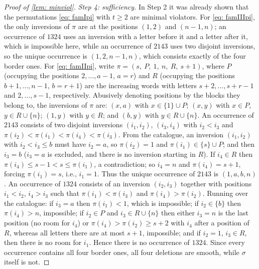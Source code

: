 \documentclass[10pt,a4paper]{amsart}
\begin{document}
\begin{proof}[Proof of \cref{lem: minviol}]
\emph{Step 4: sufficiency.}
In Step 2 it was already shown that the permutations \cref{eq: famIpi} with $t\ge2$ are minimal violators.
For \cref{eq: famIIIpi}, the only inversions of $\pi$ are at the positions $(1,2)$ and $(n-1,n)$; an occurrence of
$1324$ uses an inversion with a letter before it and a letter after it, which is impossible here, while an occurrence
of $2143$ uses two disjoint inversions, so the unique occurrence is $(1,2,n-1,n)$, which consists exactly of the four
border ones. For \cref{eq: famIIpi}, write $\pi=(s,\ P,\ 1,\ n,\ R,\ s+1)$, where $P$ (occupying the positions $2,\dots,a-1$,
$a=r$) and $R$ (occupying the positions $b+1,\dots,n-1$, $b=r+1$) are the increasing words with letters
$s+2,\dots,s+r-1$ and $2,\dots,s-1$, respectively. Abusively denoting positions by the blocks they belong to,
the inversions of $\pi$ are: $(x,a)$ with $x\in\{1\}\cup P$; $(x,y)$ with $x\in P$, $y\in R\cup\{n\}$;
$(1,y)$ with $y\in R$; and $(b,y)$ with $y\in R\cup\{n\}$.
An occurrence of $2143$ consists of two disjoint inversions $(i_1,i_2)$, $(i_3,i_4)$ with $i_2<i_3$ and
$\pi(i_2)<\pi(i_1)<\pi(i_4)<\pi(i_3)$. From the catalogue, an inversion $(i_1,i_2)$ with $i_2<i_3\le b$ must have
$i_2=a$, so $\pi(i_2)=1$ and $\pi(i_1)\in\{s\}\cup P$; and then $i_3=b$ ($i_3=a$ is excluded, and there is no
inversion starting in $R$). If $i_4\in R$ then $\pi(i_4)\le s-1<s\le\pi(i_1)$, a contradiction; so $i_4=n$ and
$\pi(i_4)=s+1$, forcing $\pi(i_1)=s$, i.e., $i_1=1$. Thus the unique occurrence of $2143$ is $(1,a,b,n)$.
An occurrence of $1324$ consists of an inversion $(i_2,i_3)$ together with positions $i_1<i_2$, $i_4>i_3$ such that
$\pi(i_1)<\pi(i_3)$ and $\pi(i_4)>\pi(i_2)$. Running over the catalogue: if $i_3=a$ then $\pi(i_1)<1$, which is
impossible; if $i_2\in\{b\}$ then $\pi(i_4)>n$, impossible; if $i_2\in P$ and $i_3\in R\cup\{n\}$ then either
$i_3=n$ is the last position (no room for $i_4$) or $\pi(i_4)>\pi(i_2)\ge s+2$ with $i_4$ after a position of $R$,
whereas all letters there are at most $s+1$, impossible; and if $i_2=1$, $i_3\in R$, then there is no room for
$i_1$. Hence there is no occurrence of $1324$. Since every occurrence contains all four border
ones, all four deletions are smooth, while $\sigma$ itself is not.
\end{proof}
\end{document}
